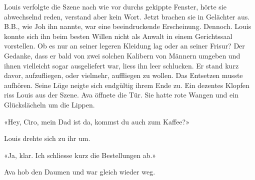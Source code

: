 Louis verfolgte die Szene nach wie vor durchs gekippte Fenster, hörte
sie abwechselnd reden, verstand aber kein Wort. Jetzt brachen sie in
Gelächter aus.
B.B., wie Joh ihn nannte, war eine beeindruckende Erscheinung. Dennoch.
Louis konnte sich ihn beim besten Willen nicht als Anwalt in einem
Gerichtssaal vorstellen. Ob es nur an seiner legeren Kleidung lag oder
an seiner Frisur?
Der Gedanke, dass er bald von zwei solchen Kalibern von Männern umgeben
und ihnen vielleicht sogar ausgeliefert war, liess ihn leer schlucken. Er stand kurz davor, aufzufliegen, oder
vielmehr, auffliegen zu wollen. Das Entsetzen musste aufhören. Seine
Lüge neigte sich endgültig ihrem Ende zu.
Ein dezentes Klopfen riss Louis aus der Szene. Ava öffnete die Tür. Sie
hatte rote Wangen und ein Glückslächeln um die Lippen.

«Hey, Ciro, mein Dad ist da, kommst du auch zum Kaffee?»

Louis drehte sich zu ihr um.

«Ja, klar. Ich schliesse kurz die Bestellungen ab.»

Ava hob den Daumen und war gleich wieder weg.
